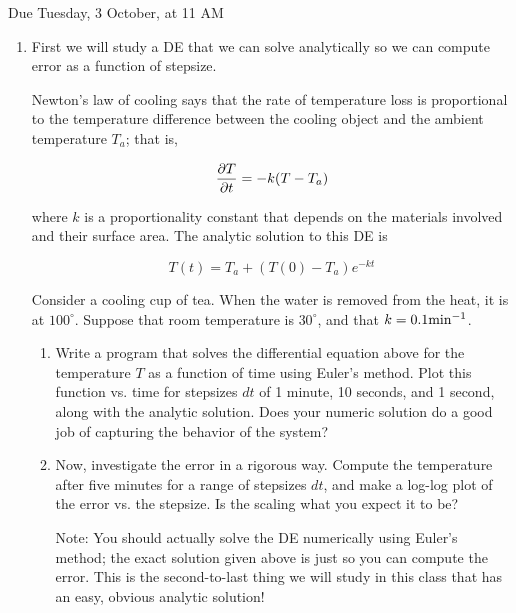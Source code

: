 \documentclass[12pt]{article}
\def\PAR#1#2{ {{\partial #1}\over{\partial #2}} }
\begin{document}
\Large
\centerline{}
\centerline{Due Tuesday, 3 October, at 11 AM}
\normalsize

\begin{enumerate}
\item{

First we will study a DE that we can solve analytically so we can compute error as a function of stepsize.

Newton's law of cooling says that the rate of temperature loss is proportional to the temperature difference between the cooling object and the ambient temperature $T_a$; that is,

\begin{equation}
\PAR{T}{t} = -k(T-T_a)
\end{equation}

where $k$ is a proportionality constant that depends on the materials involved and their surface area. The analytic solution to this DE is

\begin{equation}
T(t) = T_a + (T(0) - T_a)e^{-kt}
\end{equation}
  
Consider a cooling cup of tea. When the water is removed from the heat, it is at $100^\circ$. Suppose that room temperature is $30^\circ$, and that $k=0.1 {\rm {min}}^{-1}$.

\begin{enumerate}

\item{Write a program that solves the differential equation above for the temperature $T$ as a function of time using Euler's method. Plot this function vs. time for stepsizes $dt$ of 1 minute, 10 seconds, and 1 second, along
with the analytic solution. Does your numeric solution do a good job of capturing the behavior of the system?}

\item{Now, investigate the error in a rigorous way. Compute the temperature after five minutes for a range of stepsizes $dt$, and make a log-log plot of the error vs. the stepsize. Is the scaling what you expect it to be?}

Note: You should actually solve the DE numerically using Euler's method; the exact solution given above is just so you can compute the error. This is the second-to-last thing we will study in this class that has an easy, obvious analytic solution!

\end{enumerate}
}


\end{enumerate}
\end{document}
